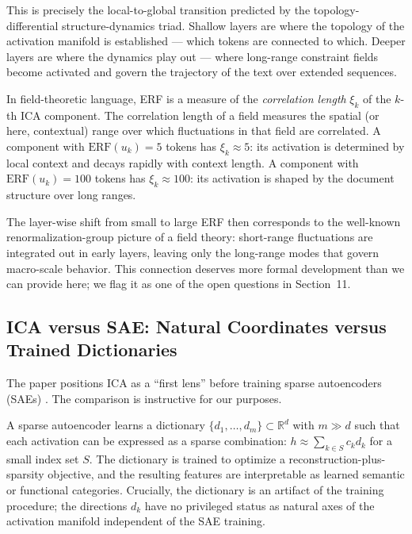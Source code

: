 \documentclass[12pt, a4paper]{article}
\theoremstyle{plain}
\theoremstyle{definition}
\theoremstyle{remark}
\newcommand{\R}{\mathbb{R}}
\newcommand{\ERF}{\mathrm{ERF}}
\begin{document}
This is precisely the local-to-global transition predicted by the
topology-differential structure-dynamics triad. Shallow layers are where the
topology of the activation manifold is established --- which tokens are
connected to which. Deeper layers are where the dynamics play out --- where
long-range constraint fields become activated and govern the trajectory of the
text over extended sequences.

In field-theoretic language, ERF is a measure of the \emph{correlation length}
$\xi_k$ of the $k$-th ICA component. The correlation length of a field
measures the spatial (or here, contextual) range over which fluctuations in
that field are correlated. A component with $\ERF(u_k) = 5$ tokens has
$\xi_k \approx 5$: its activation is determined by local context and decays
rapidly with context length. A component with $\ERF(u_k) = 100$ tokens has
$\xi_k \approx 100$: its activation is shaped by the document structure over
long ranges.

The layer-wise shift from small to large ERF then corresponds to the
well-known renormalization-group picture of a field theory: short-range
fluctuations are integrated out in early layers, leaving only the long-range
modes that govern macro-scale behavior. This connection deserves more formal
development than we can provide here; we flag it as one of the open questions
in Section~11.

\subsection{ICA versus SAE: Natural Coordinates versus Trained Dictionaries}

The \cite{liu2026icalens} paper positions ICA as a ``first lens'' before
training sparse autoencoders (SAEs) \cite{cunningham2023sae,
bricken2023monosemantic}. The comparison is instructive for our purposes.

A sparse autoencoder learns a dictionary $\{d_1, \ldots, d_m\} \subset \R^d$
with $m \gg d$ such that each activation can be expressed as a sparse
combination: $h \approx \sum_{k \in S} c_k d_k$ for a small index set $S$.
The dictionary is trained to optimize a reconstruction-plus-sparsity objective,
and the resulting features are interpretable as learned semantic or functional
categories. Crucially, the dictionary is an artifact of the training procedure;
the directions $d_k$ have no privileged status as natural axes of the
activation manifold independent of the SAE training.
\end{document}
